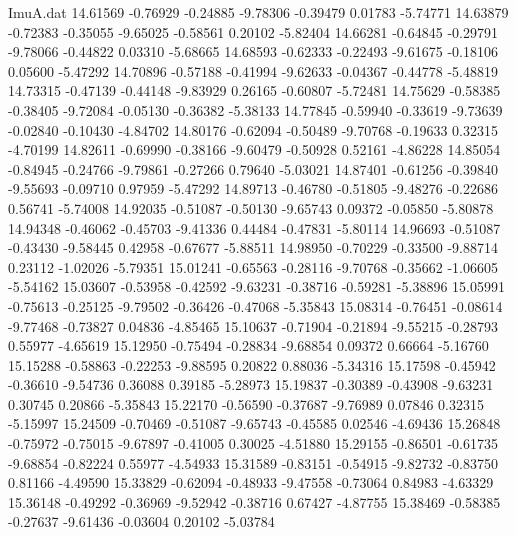 \begin{filecontents}{ImuA.dat}
  14.61569   -0.76929   -0.24885   -9.78306   -0.39479    0.01783   -5.74771
  14.63879   -0.72383   -0.35055   -9.65025   -0.58561    0.20102   -5.82404
  14.66281   -0.64845   -0.29791   -9.78066   -0.44822    0.03310   -5.68665
  14.68593   -0.62333   -0.22493   -9.61675   -0.18106    0.05600   -5.47292
  14.70896   -0.57188   -0.41994   -9.62633   -0.04367   -0.44778   -5.48819
  14.73315   -0.47139   -0.44148   -9.83929    0.26165   -0.60807   -5.72481
  14.75629   -0.58385   -0.38405   -9.72084   -0.05130   -0.36382   -5.38133
  14.77845   -0.59940   -0.33619   -9.73639   -0.02840   -0.10430   -4.84702
  14.80176   -0.62094   -0.50489   -9.70768   -0.19633    0.32315   -4.70199
  14.82611   -0.69990   -0.38166   -9.60479   -0.50928    0.52161   -4.86228
  14.85054   -0.84945   -0.24766   -9.79861   -0.27266    0.79640   -5.03021
  14.87401   -0.61256   -0.39840   -9.55693   -0.09710    0.97959   -5.47292
  14.89713   -0.46780   -0.51805   -9.48276   -0.22686    0.56741   -5.74008
  14.92035   -0.51087   -0.50130   -9.65743    0.09372   -0.05850   -5.80878
  14.94348   -0.46062   -0.45703   -9.41336    0.44484   -0.47831   -5.80114
  14.96693   -0.51087   -0.43430   -9.58445    0.42958   -0.67677   -5.88511
  14.98950   -0.70229   -0.33500   -9.88714    0.23112   -1.02026   -5.79351
  15.01241   -0.65563   -0.28116   -9.70768   -0.35662   -1.06605   -5.54162
  15.03607   -0.53958   -0.42592   -9.63231   -0.38716   -0.59281   -5.38896
  15.05991   -0.75613   -0.25125   -9.79502   -0.36426   -0.47068   -5.35843
  15.08314   -0.76451   -0.08614   -9.77468   -0.73827    0.04836   -4.85465
  15.10637   -0.71904   -0.21894   -9.55215   -0.28793    0.55977   -4.65619
  15.12950   -0.75494   -0.28834   -9.68854    0.09372    0.66664   -5.16760
  15.15288   -0.58863   -0.22253   -9.88595    0.20822    0.88036   -5.34316
  15.17598   -0.45942   -0.36610   -9.54736    0.36088    0.39185   -5.28973
  15.19837   -0.30389   -0.43908   -9.63231    0.30745    0.20866   -5.35843
  15.22170   -0.56590   -0.37687   -9.76989    0.07846    0.32315   -5.15997
  15.24509   -0.70469   -0.51087   -9.65743   -0.45585    0.02546   -4.69436
  15.26848   -0.75972   -0.75015   -9.67897   -0.41005    0.30025   -4.51880
  15.29155   -0.86501   -0.61735   -9.68854   -0.82224    0.55977   -4.54933
  15.31589   -0.83151   -0.54915   -9.82732   -0.83750    0.81166   -4.49590
  15.33829   -0.62094   -0.48933   -9.47558   -0.73064    0.84983   -4.63329
  15.36148   -0.49292   -0.36969   -9.52942   -0.38716    0.67427   -4.87755
  15.38469   -0.58385   -0.27637   -9.61436   -0.03604    0.20102   -5.03784

\end{filecontents}
